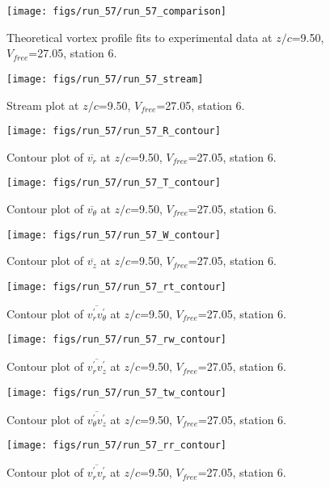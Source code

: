 \begin{figure}[H]
\centering
\texttt{[image: figs/run\_57/run\_57\_comparison]}
\caption{Theoretical vortex profile fits to experimental data at $z/c$=9.50, $V_{free}$=27.05, station 6.}
\end{figure}


\begin{figure}[H]
\centering
\texttt{[image: figs/run\_57/run\_57\_stream]}
\caption{Stream plot at $z/c$=9.50, $V_{free}$=27.05, station 6.}
\end{figure}


\begin{figure}[H]
\centering
\texttt{[image: figs/run\_57/run\_57\_R\_contour]}
\caption{Contour plot of $\overline{v_{r}}$ at $z/c$=9.50, $V_{free}$=27.05, station 6.}
\end{figure}


\begin{figure}[H]
\centering
\texttt{[image: figs/run\_57/run\_57\_T\_contour]}
\caption{Contour plot of $\overline{v_{\theta}}$ at $z/c$=9.50, $V_{free}$=27.05, station 6.}
\end{figure}


\begin{figure}[H]
\centering
\texttt{[image: figs/run\_57/run\_57\_W\_contour]}
\caption{Contour plot of $\overline{v_{z}}$ at $z/c$=9.50, $V_{free}$=27.05, station 6.}
\end{figure}


\begin{figure}[H]
\centering
\texttt{[image: figs/run\_57/run\_57\_rt\_contour]}
\caption{Contour plot of $\overline{v_{r}^{\prime} v_{\theta}^{\prime}}$ at $z/c$=9.50, $V_{free}$=27.05, station 6.}
\end{figure}


\begin{figure}[H]
\centering
\texttt{[image: figs/run\_57/run\_57\_rw\_contour]}
\caption{Contour plot of $\overline{v_{r}^{\prime} v_{z}^{\prime}}$ at $z/c$=9.50, $V_{free}$=27.05, station 6.}
\end{figure}


\begin{figure}[H]
\centering
\texttt{[image: figs/run\_57/run\_57\_tw\_contour]}
\caption{Contour plot of $\overline{v_{\theta}^{\prime} v_{z}^{\prime}}$ at $z/c$=9.50, $V_{free}$=27.05, station 6.}
\end{figure}


\begin{figure}[H]
\centering
\texttt{[image: figs/run\_57/run\_57\_rr\_contour]}
\caption{Contour plot of $\overline{v_{r}^{\prime} v_{r}^{\prime}}$ at $z/c$=9.50, $V_{free}$=27.05, station 6.}
\end{figure}


